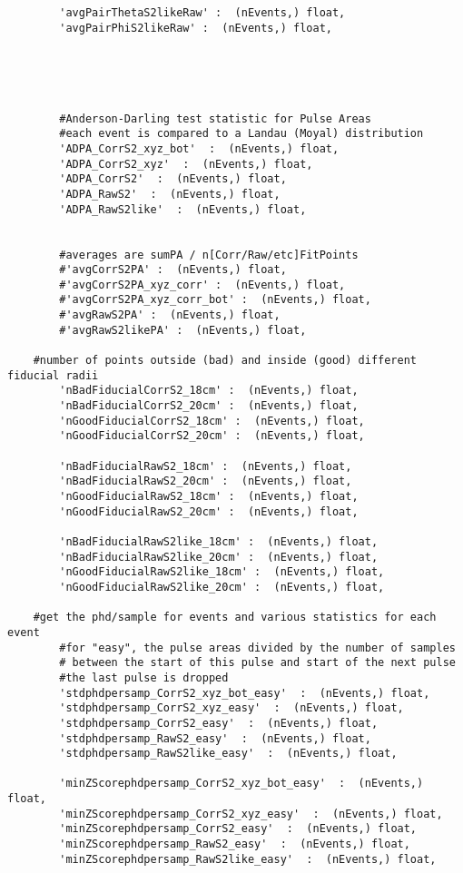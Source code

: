 \begin{verbatim}
        'avgPairThetaS2likeRaw' :  (nEvents,) float,
        'avgPairPhiS2likeRaw' :  (nEvents,) float,


        


        #Anderson-Darling test statistic for Pulse Areas
        #each event is compared to a Landau (Moyal) distribution
        'ADPA_CorrS2_xyz_bot'  :  (nEvents,) float,
        'ADPA_CorrS2_xyz'  :  (nEvents,) float,
        'ADPA_CorrS2'  :  (nEvents,) float,
        'ADPA_RawS2'  :  (nEvents,) float,
        'ADPA_RawS2like'  :  (nEvents,) float,
 

        #averages are sumPA / n[Corr/Raw/etc]FitPoints
        #'avgCorrS2PA' :  (nEvents,) float,
        #'avgCorrS2PA_xyz_corr' :  (nEvents,) float,
        #'avgCorrS2PA_xyz_corr_bot' :  (nEvents,) float,
        #'avgRawS2PA' :  (nEvents,) float,
        #'avgRawS2likePA' :  (nEvents,) float,

	#number of points outside (bad) and inside (good) different fiducial radii
        'nBadFiducialCorrS2_18cm' :  (nEvents,) float,
        'nBadFiducialCorrS2_20cm' :  (nEvents,) float,
        'nGoodFiducialCorrS2_18cm' :  (nEvents,) float,
        'nGoodFiducialCorrS2_20cm' :  (nEvents,) float,

        'nBadFiducialRawS2_18cm' :  (nEvents,) float,
        'nBadFiducialRawS2_20cm' :  (nEvents,) float,
        'nGoodFiducialRawS2_18cm' :  (nEvents,) float,
        'nGoodFiducialRawS2_20cm' :  (nEvents,) float,

        'nBadFiducialRawS2like_18cm' :  (nEvents,) float,
        'nBadFiducialRawS2like_20cm' :  (nEvents,) float,
        'nGoodFiducialRawS2like_18cm' :  (nEvents,) float,
        'nGoodFiducialRawS2like_20cm' :  (nEvents,) float,
 
 	#get the phd/sample for events and various statistics for each event
        #for "easy", the pulse areas divided by the number of samples
        # between the start of this pulse and start of the next pulse
        #the last pulse is dropped
        'stdphdpersamp_CorrS2_xyz_bot_easy'  :  (nEvents,) float,
        'stdphdpersamp_CorrS2_xyz_easy'  :  (nEvents,) float,
        'stdphdpersamp_CorrS2_easy'  :  (nEvents,) float,
        'stdphdpersamp_RawS2_easy'  :  (nEvents,) float,
        'stdphdpersamp_RawS2like_easy'  :  (nEvents,) float,

        'minZScorephdpersamp_CorrS2_xyz_bot_easy'  :  (nEvents,) float,
        'minZScorephdpersamp_CorrS2_xyz_easy'  :  (nEvents,) float,
        'minZScorephdpersamp_CorrS2_easy'  :  (nEvents,) float,
        'minZScorephdpersamp_RawS2_easy'  :  (nEvents,) float,
        'minZScorephdpersamp_RawS2like_easy'  :  (nEvents,) float,


\end{verbatim}
